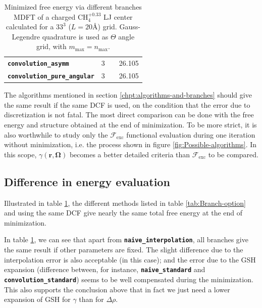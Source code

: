 \begin{table}[!b]
\begin{centering}
\begin{tabular*}{1\linewidth}{@{\extracolsep{\fill}}lccc}
\texttt{\textbf{\scriptsize{}convolution\_asymm}} & {\scriptsize{}3} & {\scriptsize{}\citep{puibasset_bridge_2012}} & {\scriptsize{}26.105}\tabularnewline
\addlinespace[-0.33em]
\texttt{\textbf{\scriptsize{}convolution\_pure\_angular}} & {\scriptsize{}3} & {\scriptsize{}\citep{puibasset_bridge_2012}} & {\scriptsize{}26.105}\tabularnewline
\bottomrule
\end{tabular*}
\par\end{centering}
\caption[Minimized free energy via different branches MDFT]{Minimized free energy via different branches MDFT of a charged $\mathrm{CH_{4}^{+0.33}}$
LJ center calculated for a $33^{3}$ ($L=20\textrm{Å}$) grid. Gauss-Legendre
quadrature is used as $\Theta$ angle grid, with $m_{\max}=n_{\max}$.\label{tab:free-energy}}
\end{table}
 

The algorithms mentioned in section \ref{chpt:algorithms-and-branches}
should give the same result if the same \acs{DCF} is used, on the
condition that the error due to discretization is not fatal. The most
direct comparison can be done with the free energy and structure obtained
at the end of minimization. To be more strict, it is also worthwhile
to study only the $\mathcal{F}_{\mathrm{exc}}$ functional evaluation
during one iteration without minimization, i.e. the process shown
in figure \ref{fig:Possible-algorithms}. In this scope, $\gamma(\mathbf{r},\mathbf{\Omega})$
becomes a better detailed criteria than $\mathcal{F}_{\mathrm{exc}}$
to be compared.

\subsection{Difference in energy evaluation}

Illustrated in table \ref{tab:free-energy}, the different methods
listed in table \ref{tab:Branch-option} and using the same \acs{DCF}
give nearly the same total free energy at the end of minimization.

In table \ref{tab:free-energy}, we can see that apart from \texttt{\textbf{naive\_interpolation}},
all branches give the same result if other parameters are fixed. The
slight difference due to the interpolation error is also acceptable
(in this case); and the error due to the \acs{GSH} expansion (difference
between, for instance, \texttt{\textbf{naive\_standard}} and \texttt{\textbf{convolution\_standard}})
seems to be well compensated during the minimization. This also supports
the conclusion above that in fact we just need a lower expansion of
\acs{GSH} for $\gamma$ than for $\Delta\rho$.

